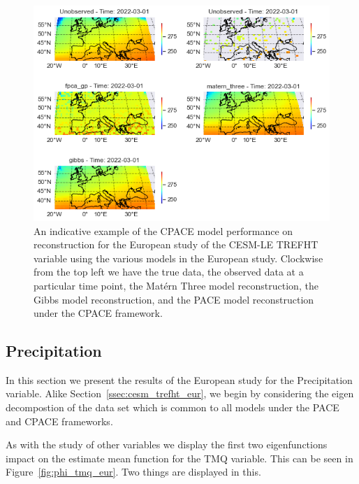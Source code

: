 \begin{figure}
	\centering
	\includegraphics[width=\textwidth]{full_ex_trefht_eur}
	\caption{An indicative example of the CPACE model performance on reconstruction for the European study of the CESM-LE TREFHT variable using the various models in the European study. Clockwise from the top left we have the true data, the observed data at a particular time point, the Mat\'ern Three model reconstruction, the Gibbs model reconstruction, and the PACE model reconstruction under the CPACE framework.}
	\label{fig:full_ex_trefht_eur}
\end{figure}

\subsection{Precipitation \label{ssec:cesm_tmq_eur}}
In this section we present the results of the European study for the Precipitation variable. 
Alike Section~\ref{ssec:cesm_trefht_eur}, we begin by considering the eigen decompostion of the data set which is common to all models under the PACE and CPACE frameworks.

As with the study of other variables we display the first two eigenfunctions impact on the estimate mean function for the TMQ variable.
This can be seen in Figure~\ref{fig:phi_tmq_eur}.
Two things are displayed in this.

